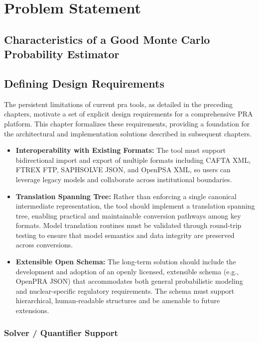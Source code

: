 \chapter{Problem Statement}

\section{Characteristics of a Good Monte Carlo Probability Estimator}

\section{Defining Design Requirements}
\label{ch:design-requirements}

The persistent limitations of current \acrshort{pra} tools, as detailed in the preceding chapters, motivate a set of explicit design requirements for a comprehensive PRA platform. This chapter formalizes these requirements, providing a foundation for the architectural and implementation solutions described in subsequent chapters.

\begin{itemize}
    \item \textbf{Interoperability with Existing Formats:} The tool must support bidirectional import and export of multiple formats including CAFTA XML, FTREX FTP, SAPHSOLVE JSON, and OpenPSA XML, so users can leverage legacy models and collaborate across institutional boundaries.
    \item \textbf{Translation Spanning Tree:} Rather than enforcing a single canonical intermediate representation, the tool should implement a translation spanning tree, enabling practical and maintainable conversion pathways among key formats. Model translation routines must be validated through round-trip testing to ensure that model semantics and data integrity are preserved across conversions.
    \item \textbf{Extensible Open Schema:} The long-term solution should include the development and adoption of an openly licensed, extensible schema (e.g., OpenPRA JSON) that accommodates both general probabilistic modeling and nuclear-specific regulatory requirements. The schema must support hierarchical, human-readable structures and be amenable to future extensions.
\end{itemize}

\subsection{Solver / Quantifier Support}
\label{subsec:solver-support}

